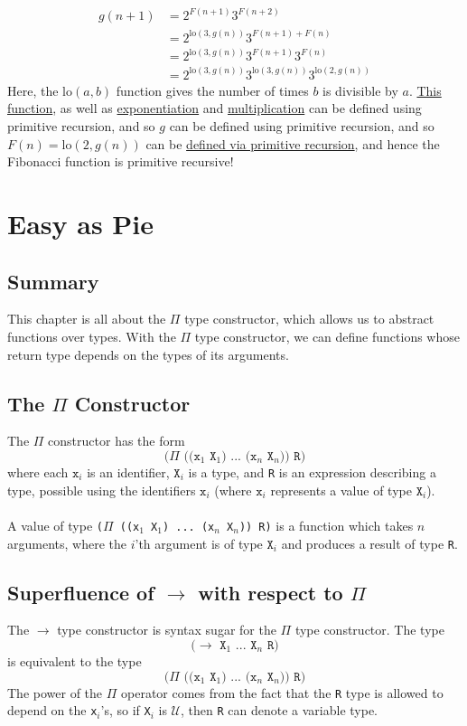 \documentclass{article}
\newcommand{\ttt}[1]{\texttt{#1}}
\newcommand{\lo}{\mathrm{lo}}
\begin{document}
\begin{itemize}
\begin{align*}
            g(n + 1) &= 2^{F(n + 1)}3^{F(n + 2)} \\
                     &= 2^{\lo(3, g(n))}3^{F(n + 1) + F(n)} \\
                     &= 2^{\lo(3, g(n))}3^{F(n + 1)} 3^{F(n)} \\
                     &= 2^{\lo(3, g(n))}3^{\lo(3, g(n))} 3^{\lo(2, g(n))}
        \end{align*}
        Here, the \(\lo(a, b)\) function gives the number of times \(b\) is divisible by \(a\). \hyperref[code:lo]{This function}, as well as \hyperref[code:exponentiation]{exponentiation} and \hyperref[code:multiplication]{multiplication} can be defined using primitive recursion, and so \(g\) can be defined using primitive recursion, and so \(F(n) = \lo(2, g(n))\) can be \hyperref[code:Fibonacci]{defined via primitive recursion}, and hence the Fibonacci function is primitive recursive!  
\end{itemize}
\section{Easy as Pie}
\subsection{Summary}
This chapter is all about the \(\Pi\) type constructor, which allows us to abstract functions over types. With the \(\Pi\) type constructor, we can define functions whose return type depends on the types of its arguments. 
\subsection{The \(\Pi\) Constructor}
The \(\Pi\) constructor has the form \[
    \ttt{(\(\Pi\) ((x\(_1\) X\(_1\)) ... (x\(_n\) X\(_n\))) R)}
\]
where each \(\ttt{x}_i\) is an identifier, \(\ttt{X}_i\) is a type, and \ttt{R} is an expression describing a type, possible using the identifiers \(\ttt{x}_i\) (where \(\ttt{x}_i\) represents a value of type \(\ttt{X}_i\)).
\\ \\
A value of type \ttt{(\(\Pi\) ((x\(_1\) X\(_1\)) ... (x\(_n\) X\(_n\))) R)} is a function which takes \(n\) arguments, where the \(i\)'th argument is of type \(\ttt{X}_i\) and produces a result of type \ttt{R}.
\subsection{Superfluence of \(\to\) with respect to \(\Pi\)}
The \(\to\) type constructor is syntax sugar for the \(\Pi\) type constructor. The type \[
    \ttt{(\(\to\) X\(_1\) ... X\(_n\) R)}
\] is equivalent to the type \[
    \ttt{(\(\Pi\) ((x\(_1\) X\(_1\)) ... (x\(_n\) X\(_n\))) R)}
\]
The power of the \(\Pi\) operator comes from the fact that the \ttt{R} type is allowed to depend on the \ttt{x}\(_i\)'s, so if \ttt{X}\(_i\) is \(\mathcal{U}\), then \ttt{R} can denote a variable type.
\end{document}
